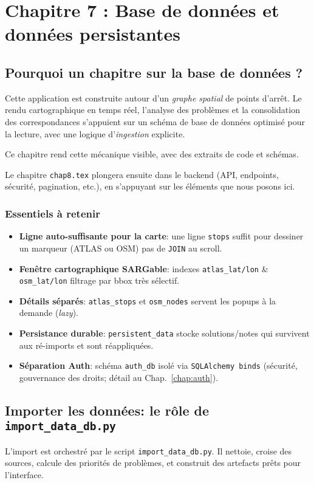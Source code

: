 \chapter{Chapitre 7 : Base de données et données persistantes}

\section*{Pourquoi un chapitre sur la base de données ?}

Cette application est construite autour d'un \textit{graphe spatial} de points d'arrêt. Le rendu cartographique en temps réel, l'analyse des problèmes et la consolidation des correspondances s'appuient sur un schéma de base de données optimisé pour la lecture, avec une logique d'\textit{ingestion} explicite. 

Ce chapitre rend cette mécanique visible, avec des extraits de code et schémas.

\vspace{0.5em}
Le chapitre \texttt{chap8.tex} plongera ensuite dans le backend (API, endpoints, sécurité, pagination, etc.), en s'appuyant sur les éléments que nous posons ici.

\subsection*{Essentiels à retenir}
\begin{itemize}
  \item \textbf{Ligne auto-suffisante pour la carte}: une ligne \texttt{stops} suffit pour dessiner un marqueur (ATLAS ou OSM) \Rightarrow pas de \texttt{JOIN} au scroll.
  \item \textbf{Fenêtre cartographique SARGable}: indexes \texttt{atlas\_lat/lon} \& \texttt{osm\_lat/lon} \Rightarrow filtrage par bbox très sélectif.
  \item \textbf{Détails séparés}: \texttt{atlas\_stops} et \texttt{osm\_nodes} servent les popups à la demande (\textit{lazy}).
  \item \textbf{Persistance durable}: \texttt{persistent\_data} stocke solutions/notes qui \og survivent \fg{} aux ré-imports et sont réappliquées.
  \item \textbf{Séparation Auth}: schéma \texttt{auth\_db} isolé via \texttt{SQLAlchemy binds} (sécurité, gouvernance des droits; détail au Chap.~\ref{chap:auth}).
\end{itemize}

\section{Importer les données: le rôle de \texttt{import\_data\_db.py}}
L'import est orchestré par le script \texttt{import\_data\_db.py}. Il nettoie, croise des sources, calcule des priorités de problèmes, et construit des artefacts prêts pour l'interface.

